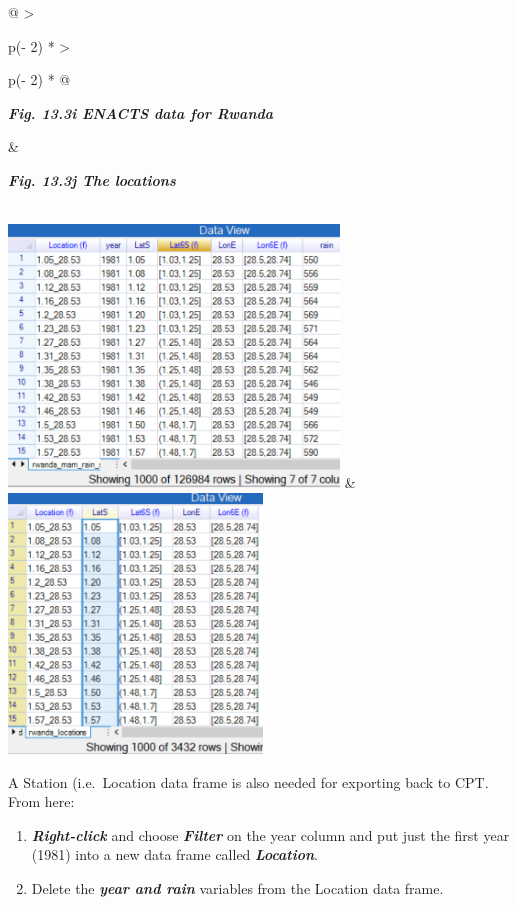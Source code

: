 \documentclass[
  letterpaper,
  DIV=11,
  numbers=noendperiod]{scrreprt}
\begin{document}
\begin{longtable}[]{@{}
  >{\raggedright\arraybackslash}p{(\columnwidth - 2\tabcolsep) * }
  >{\raggedright\arraybackslash}p{(\columnwidth - 2\tabcolsep) * }@{}}
\toprule\noalign{}
\begin{minipage}[b]{\linewidth}\raggedright
\textbf{\emph{Fig. 13.3i ENACTS data for Rwanda}}
\end{minipage} & \begin{minipage}[b]{\linewidth}\raggedright
\textbf{\emph{Fig. 13.3j The locations}}
\end{minipage} \\
\midrule\noalign{}
\endhead
\bottomrule\noalign{}
\endlastfoot
\includegraphics[width=3.45974in,height=2.74871in]{figures/Fig13.3i.png}
&
\includegraphics[width=2.65551in,height=2.72261in]{figures/Fig13.3j.png} \\
\end{longtable}

A Station (i.e.~Location data frame is also needed for exporting back to
CPT. From here:

\begin{enumerate}
\def\labelenumi{\alph{enumi})}
\item
  \textbf{\emph{Right-click}} and choose \textbf{\emph{Filter}} on the
  year column and put just the first year (1981) into a new data frame
  called \textbf{\emph{Location}}.
\item
  Delete the \textbf{\emph{year and rain}} variables from the Location
  data frame.
\end{enumerate}
\end{document}
